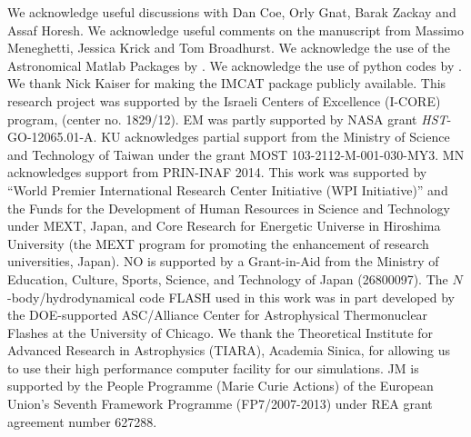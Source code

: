\documentclass[iop,twocolumn]{emulateapj}
\begin{document}
\acknowledgments
We acknowledge useful discussions with Dan Coe, Orly Gnat, Barak Zackay and Assaf Horesh. We acknowledge useful comments on the manuscript from Massimo Meneghetti, Jessica Krick and Tom Broadhurst. We acknowledge the use of the Astronomical Matlab Packages by \cite{Ofek2014}.  We acknowledge the use of python codes by \cite{Foreman-Mackey2014}.
We thank Nick Kaiser for making the IMCAT package publicly available.  
This research project was supported by the Israeli Centers of Excellence (I-CORE) program, (center no. 1829/12).
EM was partly supported by NASA grant {\it HST}-GO-12065.01-A.
KU acknowledges partial support from 
the Ministry of Science and Technology of Taiwan under the grant
MOST 103-2112-M-001-030-MY3.
MN acknowledges support from PRIN-INAF 2014.
This work was supported by ``World Premier International Research Center
Initiative (WPI Initiative)'' and the Funds for the Development of Human
Resources in Science and Technology under MEXT, Japan, and  Core Research for 
Energetic Universe in Hiroshima University (the MEXT program for promoting the 
enhancement of research universities, Japan). NO is supported by a Grant-in-Aid 
from the Ministry of Education, Culture, Sports, Science, and Technology
of Japan  (26800097).
The $N$-body/hydrodynamical code FLASH used in this work was in part 
developed by the DOE-supported ASC/Alliance Center for Astrophysical 
Thermonuclear Flashes at the University of Chicago. We thank the 
Theoretical Institute for Advanced Research in Astrophysics (TIARA), 
Academia Sinica, for allowing us to use their high performance computer
facility for our simulations.
JM is supported by the People Programme (Marie
Curie Actions) of the European Union's Seventh Framework
Programme (FP7/2007-2013) under REA grant agreement
number 627288.


\end{document}
